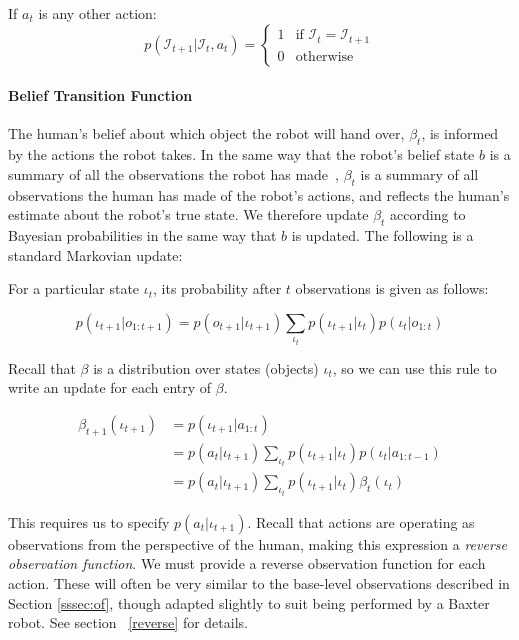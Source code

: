 \documentclass[conference]{IEEEtran}
\newcommand{\Iota}{\mathcal{I}}
\begin{document}
If $a_t$ is any other action: 
\begin{equation*}
	p(\Iota_{t+1} | \Iota_t, a_t) = \begin{cases}
		1 & \text{if $\Iota_{t} = \Iota_{t+1}$} \\ 
		0 & \text{otherwise}
	\end{cases}
\end{equation*}

\paragraph{Belief Transition Function}

The human's belief about which object the robot will hand over, $\beta_t$, is informed by the actions the robot takes. In the same way that the robot's belief state $b$ is a summary of all the observations the robot has made~\citep{kaelbling99}, $\beta_t$ is a summary of all observations the human has made of the robot's actions, and reflects the human's estimate about the robot's true state. We therefore update $\beta_t$ according to Bayesian probabilities in the same way that $b$ is updated. The following is a standard Markovian update: 

For a particular state $\iota_t$, its probability after $t$ observations is given as follows: 

\begin{equation*}
	p(\iota_{t+1} | o_{1:t+1}) = p(o_{t+1} | \iota_{t+1}) \sum_{\iota_{t}} p(\iota_{t+1} | \iota_{t}) p (\iota_{t} | o_{1:t})
\end{equation*}

Recall that $\beta$ is a distribution over states (objects) $\iota_t$, so we can use this rule to write an update for each entry of $\beta$. 

\begin{align*}
	\beta_{t+1}(\iota_{t+1})&= p(\iota_{t+1} | a_{1:t})  \\
	&= p(a_{t} | \iota_{t+1}) \sum_{\iota_{t}} p(\iota_{t+1} | \iota_{t}) p (\iota_{t} | a_{1:t-1}) \\ 
	&= p(a_{t} | \iota_{t+1}) \sum_{\iota_{t}} p(\iota_{t+1} | \iota_{t}) \beta_{t}(\iota_{t}) 
\end{align*}

This requires us to specify $p(a_{t} | \iota_{t+1})$. Recall that actions are operating as observations from the perspective of the human, making this expression a \emph{reverse observation function}. We must provide a reverse observation function for each action. These will often be very similar to the base-level observations described in Section \ref{sssec:of}, though adapted slightly to suit being performed by a Baxter robot. See section ~\ref{reverse} for details. 
\end{document}
